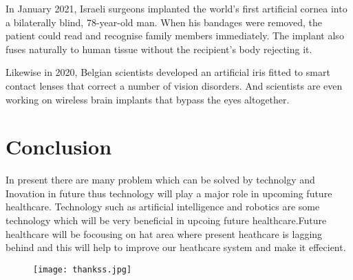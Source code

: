 \documentclass[12pt]{report}
\begin{document}
In January 2021, Israeli surgeons implanted the world’s first artificial cornea into a bilaterally blind, 78-year-old man. When his bandages were removed, the patient could read and recognise family members immediately. The implant also fuses naturally to human tissue without the recipient’s body rejecting it.

Likewise in 2020, Belgian scientists developed an artificial iris fitted to smart contact lenses that correct a number of vision disorders. And scientists are even working on wireless brain implants that bypass the eyes altogether.
\clearpage

\section{Conclusion}
In present there are many problem which can be solved by technolgy and Inovation in future thus technology will play a major role in upcoming future healthcare. Technology such as artificial intelligence and robotics are some technology which will be very beneficial in upcoing future healthcare.Future healthcare will be focousing on hat area where present heathcare is lagging behind and this will help to improve our heathcare system and make it effecient.





\clearpage

\begin{figure}
\centering
\texttt{[image: thankss.jpg]}
\end{figure}











\clearpage
\end{document}
